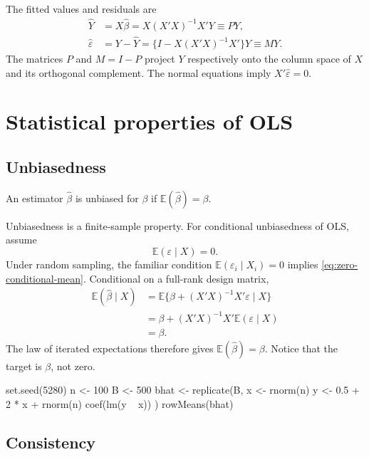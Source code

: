 The fitted values and residuals are
\begin{align*}
  \widehat Y&=X\widehat\beta
    =X(X'X)^{-1}X'Y\equiv PY,\\
  \widehat\varepsilon&=Y-\widehat Y
    =\{I-X(X'X)^{-1}X'\}Y\equiv MY.
\end{align*}
The matrices $P$ and $M=I-P$ project $Y$ respectively onto the column space
of $X$ and its orthogonal complement.  The normal equations imply
$X'\widehat\varepsilon=0$.

\section{Statistical properties of OLS}

\subsection{Unbiasedness}

\begin{definition}[Unbiasedness]
An estimator $\widehat\beta$ is unbiased for $\beta$ if
$\mathbb E(\widehat\beta)=\beta$.
\end{definition}

Unbiasedness is a finite-sample property.  For conditional unbiasedness of
OLS, assume
\begin{equation}
\label{eq:zero-conditional-mean}
  \mathbb E(\varepsilon\mid X)=0.
\end{equation}
Under random sampling, the familiar condition
$\mathbb E(\varepsilon_i\mid X_i)=0$ implies
\eqref{eq:zero-conditional-mean}.  Conditional on a full-rank design matrix,
\begin{align*}
  \mathbb E(\widehat\beta\mid X)
  &=\mathbb E\{\beta+(X'X)^{-1}X'\varepsilon\mid X\}\\
  &=\beta+(X'X)^{-1}X'\mathbb E(\varepsilon\mid X)\\
  &=\beta.
\end{align*}
The law of iterated expectations therefore gives
$\mathbb E(\widehat\beta)=\beta$.  Notice that the target is $\beta$, not
zero.

\begin{rcode}
set.seed(5280)
n <- 100
B <- 500
bhat <- replicate(B, {
  x <- rnorm(n)
  y <- 0.5 + 2 * x + rnorm(n)
  coef(lm(y ~ x))
})
rowMeans(bhat)
\end{rcode}

\subsection{Consistency}

